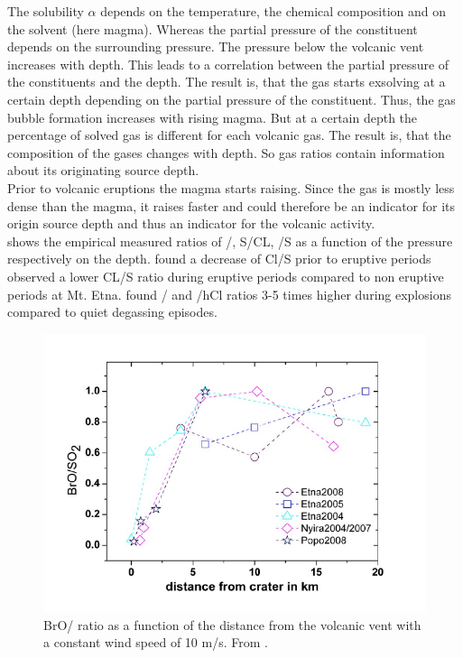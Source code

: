 \documentclass  [
  paper    = a4,
  BCOR     = 10mm,
  twoside,
  fontsize = 12pt,
  fleqn,
  toc      = bibnumbered,
  toc      = listofnumbered,
  numbers  = noendperiod,
  headings = normal,
  listof   = leveldown,
  version  = 3.03
]                                       {scrreprt}
\begin{document}
	The solubility $\alpha$ depends on the temperature, the chemical composition and on the solvent (here magma). Whereas the partial pressure of the constituent depends on the surrounding pressure. The pressure below the volcanic vent increases with depth. This leads to a correlation between the partial pressure of the constituents and the depth.
	The result is, that the gas starts exsolving at a certain depth depending on the  partial pressure of the constituent. Thus, the gas bubble formation increases with rising magma. But at a certain depth the percentage of solved gas is different for each volcanic gas. The result is, that the composition of the gases changes with depth. So gas ratios contain information about its originating source depth.\\
	Prior to volcanic eruptions the magma starts raising. Since the gas is mostly less dense than the magma, it raises faster and could therefore be an indicator for its origin source depth and thus an indicator for the volcanic activity.\\
	 shows the empirical measured ratios of  /, S/CL, /S as a function of the pressure respectively on the depth.
	\citet{noguchi1963prediction} found a decrease of Cl/S prior to eruptive periods
	\citet{pennisi1998variations} observed a lower CL/S ratio during eruptive periods compared to non eruptive periods at Mt. Etna.
	\citet{burton2007magmatic}  found / and /hCl ratios 3-5 times higher during explosions  compared to quiet degassing episodes.
	 \begin{figure}
		\centering
		\includegraphics[width=0.7\linewidth]{Bilder/rat_diff}
		\caption{BrO/ ratio as a function of the distance from the volcanic vent with a constant wind speed of 10 m/s. From \citet{lubcke2014optical}.}
		\label{fig:ratdiff}
	\end{figure}	
\end{document}
